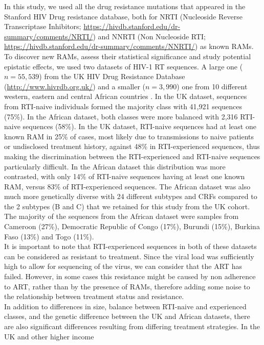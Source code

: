 \documentclass[
  11,
]{scrbook}
\begin{document}
In this study, we used all the drug resistance mutations that appeared
in the Stanford HIV Drug resistance database, both for NRTI (Nucleoside
Reverse Transcriptase Inhibitors;
\url{https://hivdb.stanford.edu/dr-summary/comments/NRTI/}) and NNRTI (Non
Nucleoside RTI; \url{https://hivdb.stanford.edu/dr-summary/comments/NNRTI/})
as known RAMs. To discover new RAMs, assess their statistical
significance and study potential epistatic effects, we used two datasets
of HIV-1 RT sequences. A large one (\(n=55,539\)) from the UK HIV Drug
Resistance Database (\url{http://www.hivrdb.org.uk/}) and a smaller
(\(n=3,990\)) one from 10 different western, eastern and central African
countries \autocite{villabona-arenasIndepthAnalysisHIV12016}. In the UK dataset,
sequences from RTI-naive individuals formed the majority class with
41,921 sequences (75\%). In the African dataset, both classes were more
balanced with 2,316 RTI-naive sequences (58\%). In the UK dataset,
RTI-naive sequences had at least one known RAM in 25\% of cases, most
likely due to transmissions to naive patients or undisclosed treatment
history, against 48\% in RTI-experienced sequences, thus making the
discrimination between the RTI-experienced and RTI-naive sequences
particularly difficult. In the African dataset this distribution was
more contrasted, with only 14\% of RTI-naive sequences having at least
one known RAM, versus 83\% of RTI-experienced sequences. The African
dataset was also much more genetically diverse with 24 different
subtypes and CRFs compared to the 2 subtypes (B and C) that we retained
for this study from the UK cohort. The majority of the sequences from
the African dataset were samples from Cameroon (27\%), Democratic
Republic of Congo (17\%), Burundi (15\%), Burkina Faso (13\%) and Togo
(11\%).\\
It is important to note that RTI-experienced sequences in both of these
datasets can be considered as resistant to treatment. Since the viral
load was sufficiently high to allow for sequencing of the virus, we can
consider that the ART has failed. However, in some cases this resistance
might be caused by non adherence to ART, rather than by the presence of
RAMs, therefore adding some noise to the relationship between treatment
status and resistance.\\
In addition to differences in size, balance between RTI-naive and
experienced classes, and the genetic difference between the UK and
African datasets, there are also significant differences resulting from
differing treatment strategies. In the UK and other higher income
\end{document}
